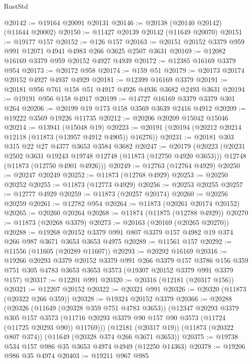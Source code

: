 \begin{lexlean}{RustStd}
\begin{coremodule}
@20142 := @19164 @20091 @20131
@20146 := @20138 (@20140 @20142) (@11644 @20002)
@20150 := @11427 @20139 @20142 (@11649 @20070)
@20151 := @19177 @157
@20152 := @126 @157
@20163 := @20151 @20152 @3379 @959 @991 @12071 @4941 @4983 @266 @3625 @2507 @3631
@20169 := @12082 @16169 @3379 @959 @20152 @4927 @4939
@20172 := @12385 @16169 @3379 @954
@20173 := @20172 @958
@20174 := @159 @51
@20179 := @20173 @20174 @20152 @4927 @4937 @4929
@20181 := @12399 @16169 @3379
@20191 := @20181 @956 @761 @158 @51 @4917 @4926 @4936 @3682 @2493 @3631
@20194 := @19191 @956 @158 @4917
@20199 := @14727 @16169 @3379 @3379 @301 @264
@20206 := @20199 @19 @173 @158 @3569 @3639 @2416 @4912
@20209 := @19222 @3569 @19226 @11735
@20212 := @20206 @20209 @15042 @15046
@20214 := @13941 (@15048 @19)
@20223 := @20191 (@20194 (@20212 @20214 @12118 (@11873 (@13957 @4912 @4905)) @16276))
@20231 := @20181 @303 @315 @22 @27 @4377 @3653 @3584 @3682
@20247 := @20179
    (@20223
      (@20231 @2502 @3631 @19243 @19748 @12748 (@11873 (@12750 @4920 @3653)))
      @12748
      (@11873 (@12750 @4901 @4926)))
@20249 := @12763 (@12764 @4929)
@20250 := @20247 @20249
@20252 := @11873 (@12768 @4929)
@20253 := @20250 @20252
@20255 := @11873 (@12773 @4929)
@20256 := @20253 @20255
@20257 := @12777 @4929
@20259 := @11873 (@20257 @20174)
@20260 := @20256 @20259
@20261 := @12782 @954
@20264 := @11873 (@20261 @20174 @20152)
@20265 := @20260 @20264
@20268 := @11874 (@11875 (@12788 @4929))
@20270 := @11873 (@20268 @3379)
@20273 := @20163 (@20169 (@20265 @20270))
@20288 := @19268 @20152 @3379 @991 @807 @3379 @157 @4982 @19 @374 @266 @987 @3671 @3653 @3653 @4975
@20289 := @11561 @157
@20292 := @11556 (@11605 (@20289 @11607))
@20293 := @20292 @16169
@20316 := @19266
    @20293
    @3379
    @20152
    @3379
    @991
    @266
    @3379
    @157
    @3786
    @156
    @359
    @751
    @305
    @4783
    @3653
    @3653
    @3573
    (@19307 @20152 @3379 @991 @3379 @157)
@20317 := @12201 @991
@20320 := @20316 (@12181 (@20317 @156))
@20321 := @12207 @20152
@20322 := @20321 @991
@20326 := @20320 (@11873 (@20322 @266 @359))
@20328 := @19324 @20152 @3379
@20366 := @20288
    (@20326
      (@11649 (@20328 @359 @751 @4783 @3653))
      (@12347
        @20293
        @3379
        @305
        @157
        @3573
        (@11716 @20293 @3379 @90 @157 @90 @3573 (@11724 (@11725 @20293 @90)) @11769)))
    (@12181 (@20317 @19))
    (@11873 (@20322 @807 @374))
    (@11649 (@20328 @374 @266 @3671 @3653))
@20375 := @19738 @534 @157 @986 @35 @3653 @4974 @4949 (@12250 @14363)
@20378 := @19206 @986 @35 @4974
@20403 := @19211
    @967
    @985

\end{coremodule}
\end{lexlean}
